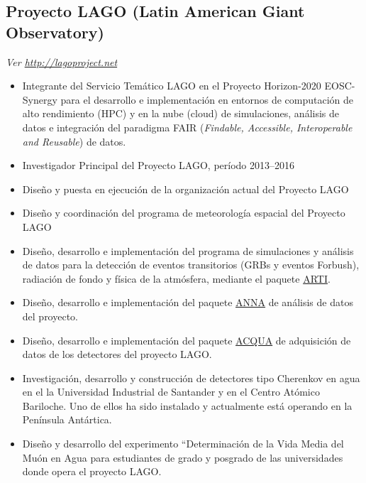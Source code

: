 \subsection*{Proyecto LAGO (Latin American Giant Observatory)}
{\small{\textit{Ver \href{http://lagoproject.net}{http://lagoproject.net}}}}
\begin{itemize}
\item Integrante del Servicio Temático LAGO en el Proyecto Horizon-2020 EOSC-Synergy para el desarrollo e implementación en entornos de computación de alto rendimiento (HPC) y en la nube (cloud) de simulaciones, análisis de datos e integración del paradigma FAIR (\emph{Findable, Accessible, Interoperable and Reusable}) de datos.
\item Investigador Principal del Proyecto LAGO, período 2013--2016
\item Diseño y puesta en ejecución de la organización actual del Proyecto LAGO
\item Diseño y coordinación del programa de meteorología espacial del Proyecto LAGO
\item Diseño, desarrollo e implementación del programa de simulaciones y análisis de datos para la detección de eventos transitorios (GRBs y eventos Forbush), radiación de fondo y física de la atmósfera, mediante el paquete \href{https://github.com/lagoproject/arti}{ARTI}.
\item Diseño, desarrollo e implementación del paquete \href{https://github.com/lagoproject/anna}{ANNA} de análisis de datos del proyecto.
\item Diseño, desarrollo e implementación del paquete \href{https://github.com/lagoproject/acqua}{ACQUA} de adquisición de datos de los detectores del proyecto LAGO.
\item Investigación, desarrollo y construcción de detectores tipo Cherenkov en agua en el la Universidad Industrial de Santander y en el Centro Atómico Bariloche.
Uno de ellos ha sido instalado y actualmente está operando en la Península Antártica.
\item Diseño y desarrollo del experimento ``Determinación de la Vida Media del Muón en Agua para estudiantes de grado y posgrado de las universidades donde opera el proyecto LAGO\@.
\end{itemize}

